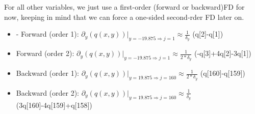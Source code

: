 \documentclass[10pt]{article}
\begin{document}
For all other variables, we just use a first-order (forward or backward)FD for now, keeping in mind that we can force a one-sided second-rder FD later on.
\begin{itemize}
	\item - Forward (order 1):  $\partial_y (q(x,y)) |_{y = -19.875 \Rightarrow j = 1} \approx \frac{1}{\delta_y}$ (q[2]-q[1])
	\item Forward (order 2):  $\partial_y (q(x,y)) |_{y = -19.875 \Rightarrow j = 1} \approx \frac{1}{2*\delta_y}$ (-q[3]+4q[2]-3q[1])
	\item Backward (order 1):  $\partial_y (q(x,y)) |_{y = 19.875 \Rightarrow j = 160} \approx \frac{1}{2*\delta_y}$ (q[160]-q[159])
	\item Backward (order 2):  $\partial_y (q(x,y)) |_{y = 19.875 \Rightarrow j = 160} \approx \frac{1}{\delta_y}$ (3q[160]-4q[159]+q[158])
	
\end{itemize}
\end{document}
